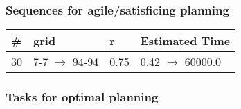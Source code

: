 \documentclass{article}
\begin{document}
                         \subsubsection*{Sequences for agile/satisficing planning}

                        \begin{center}
                        \begin{tabular}{@{}l|l|l|l@{}}
                        \# & grid & r & Estimated Time\\\midrule
                        30&7-7 $\rightarrow$ 94-94&0.75&0.42 $\rightarrow$ 60000.0
                        \end{tabular}
                        \end{center}
                    
                                \subsubsection*{Tasks for optimal planning}
                                
\end{document}
